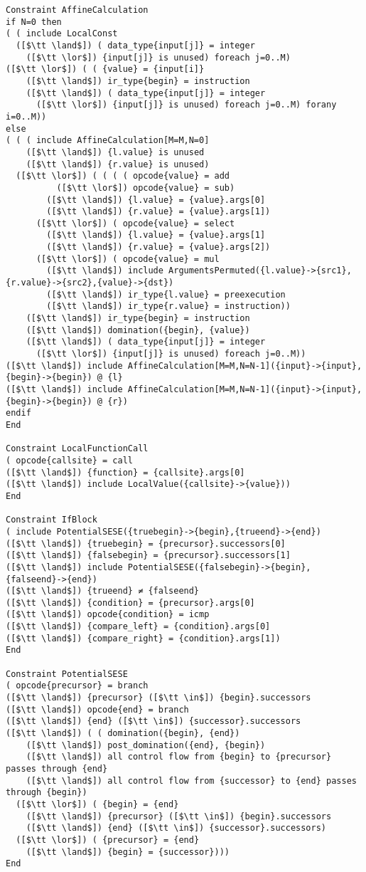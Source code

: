 \begin{lstlisting}[language=CAnDL]
Constraint AffineCalculation
if N=0 then
( ( include LocalConst
  ([$\tt \land$]) ( data_type{input[j]} = integer
    ([$\tt \lor$]) {input[j]} is unused) foreach j=0..M)
([$\tt \lor$]) ( ( {value} = {input[i]}
    ([$\tt \land$]) ir_type{begin} = instruction
    ([$\tt \land$]) ( data_type{input[j]} = integer
      ([$\tt \lor$]) {input[j]} is unused) foreach j=0..M) forany i=0..M))
else
( ( ( include AffineCalculation[M=M,N=0]
    ([$\tt \land$]) {l.value} is unused
    ([$\tt \land$]) {r.value} is unused)
  ([$\tt \lor$]) ( ( ( ( opcode{value} = add
          ([$\tt \lor$]) opcode{value} = sub)
        ([$\tt \land$]) {l.value} = {value}.args[0]
        ([$\tt \land$]) {r.value} = {value}.args[1])
      ([$\tt \lor$]) ( opcode{value} = select
        ([$\tt \land$]) {l.value} = {value}.args[1]
        ([$\tt \land$]) {r.value} = {value}.args[2])
      ([$\tt \lor$]) ( opcode{value} = mul
        ([$\tt \land$]) include ArgumentsPermuted({l.value}->{src1},{r.value}->{src2},{value}->{dst})
        ([$\tt \land$]) ir_type{l.value} = preexecution
        ([$\tt \land$]) ir_type{r.value} = instruction))
    ([$\tt \land$]) ir_type{begin} = instruction
    ([$\tt \land$]) domination({begin}, {value})
    ([$\tt \land$]) ( data_type{input[j]} = integer
      ([$\tt \lor$]) {input[j]} is unused) foreach j=0..M))
([$\tt \land$]) include AffineCalculation[M=M,N=N-1]({input}->{input},{begin}->{begin}) @ {l}
([$\tt \land$]) include AffineCalculation[M=M,N=N-1]({input}->{input},{begin}->{begin}) @ {r})
endif
End

Constraint LocalFunctionCall
( opcode{callsite} = call
([$\tt \land$]) {function} = {callsite}.args[0]
([$\tt \land$]) include LocalValue({callsite}->{value}))
End

Constraint IfBlock
( include PotentialSESE({truebegin}->{begin},{trueend}->{end})
([$\tt \land$]) {truebegin} = {precursor}.successors[0]
([$\tt \land$]) {falsebegin} = {precursor}.successors[1]
([$\tt \land$]) include PotentialSESE({falsebegin}->{begin},{falseend}->{end})
([$\tt \land$]) {trueend} ≠ {falseend}
([$\tt \land$]) {condition} = {precursor}.args[0]
([$\tt \land$]) opcode{condition} = icmp
([$\tt \land$]) {compare_left} = {condition}.args[0]
([$\tt \land$]) {compare_right} = {condition}.args[1])
End

Constraint PotentialSESE
( opcode{precursor} = branch
([$\tt \land$]) {precursor} ([$\tt \in$]) {begin}.successors
([$\tt \land$]) opcode{end} = branch
([$\tt \land$]) {end} ([$\tt \in$]) {successor}.successors
([$\tt \land$]) ( ( domination({begin}, {end})
    ([$\tt \land$]) post_domination({end}, {begin})
    ([$\tt \land$]) all control flow from {begin} to {precursor} passes through {end}
    ([$\tt \land$]) all control flow from {successor} to {end} passes through {begin})
  ([$\tt \lor$]) ( {begin} = {end}
    ([$\tt \land$]) {precursor} ([$\tt \in$]) {begin}.successors
    ([$\tt \land$]) {end} ([$\tt \in$]) {successor}.successors)
  ([$\tt \lor$]) ( {precursor} = {end}
    ([$\tt \land$]) {begin} = {successor})))
End


\end{lstlisting}
